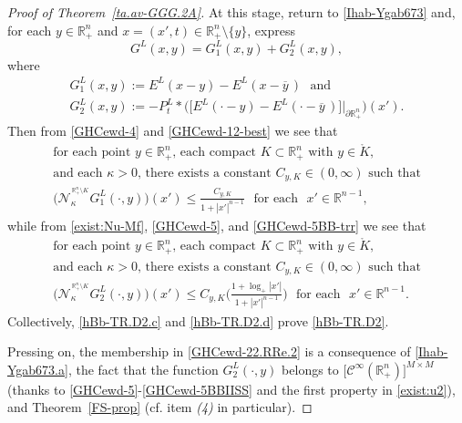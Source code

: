 \documentclass[11pt,reqno]{amsart}
\numberwithin{equation}{section}
\theoremstyle{remark}
\begin{document}
\begin{proof}[Proof of Theorem~\ref{ta.av-GGG.2A}]
At this stage, return to \eqref{Ihab-Ygab673} and, for each $y\in{\mathbb{R}}^n_{+}$ and 
$x=(x',t)\in{\mathbb{R}}^n_{+}\setminus\{y\}$, express
%
\begin{equation}\label{Ihab-Ygab673.a}
G^L(x,y)=G^L_1(x,y)+G^L_2(x,y),
\end{equation}
%
where 
%
\begin{equation}\label{Ihab-Ygab673.b}
\begin{array}{c}
G^L_1(x,y):=E^L(x-y)-E^L(x-\overline{y}\,)\,\,\text{ and}
\\[6pt]
G^L_2(x,y):=-P^L_t\ast\Big(\big[E^L(\cdot-y)-E^L(\cdot-\overline{y}\,)\big]\big|_{\partial{\mathbb{R}}^n_{+}}\Bigr)(x').
\end{array}
\end{equation}
%
Then from \eqref{GHCewd-4} and \eqref{GHCewd-12-best} we see that
%
\begin{equation}\label{hBb-TR.D2.c}
\begin{array}{c}
\text{for each point $y\in{\mathbb{R}}^n_{+}$, each compact $K\subset{\mathbb{R}}^n_{+}$ 
with $y\in\mathring{K}$}, 
\\[6pt]
\text{and each $\kappa>0$, there exists a constant $C_{y,K}\in(0,\infty)$ such that}
\\[10pt]
\displaystyle
\big(\mathcal{N}^{^{\,{\mathbb{R}}^n_{+}\setminus K}}_\kappa G^L_1(\cdot,y)\big)(x')\leq
\frac{C_{y,K}}{1+|x'|^{n-1}}\,\,\text{ for each }\,\,x'\in{\mathbb{R}}^{n-1},
\end{array}
\end{equation}
%
while from \eqref{exist:Nu-Mf}, \eqref{GHCewd-5}, and \eqref{GHCewd-5BB-trr} we see that
%
\begin{equation}\label{hBb-TR.D2.d}
\begin{array}{c}
\text{for each point $y\in{\mathbb{R}}^n_{+}$, each compact $K\subset{\mathbb{R}}^n_{+}$ 
with $y\in\mathring{K}$}, 
\\[6pt]
\text{and each $\kappa>0$, there exists a constant $C_{y,K}\in(0,\infty)$ such that}
\\[10pt]
\displaystyle
\big(\mathcal{N}^{^{\,{\mathbb{R}}^n_{+}\setminus K}}_\kappa G^L_2(\cdot,y)\big)(x')\leq
C_{y,K}\Big(\frac{1+\log_{+}|x'|}{1+|x'|^{n-1}}\Big)\,\,\text{ for each }\,\,x'\in{\mathbb{R}}^{n-1}.
\end{array}
\end{equation}
%
Collectively, \eqref{hBb-TR.D2.c} and \eqref{hBb-TR.D2.d} prove \eqref{hBb-TR.D2}.

Pressing on, the membership in \eqref{GHCewd-22.RRe.2} is a consequence of \eqref{Ihab-Ygab673.a}, the fact 
that the function $G^L_2(\cdot,y)$ belongs to $\big[{\mathscr{C}}^\infty({\mathbb{R}}^n_{+})\big]^{M\times M}$ 
(thanks to \eqref{GHCewd-5}-\eqref{GHCewd-5BBIISS} and the first property in \eqref{exist:u2}), 
and Theorem~\ref{FS-prop} (cf. item {\it (4)} in particular). 


\end{proof}
\end{document}
